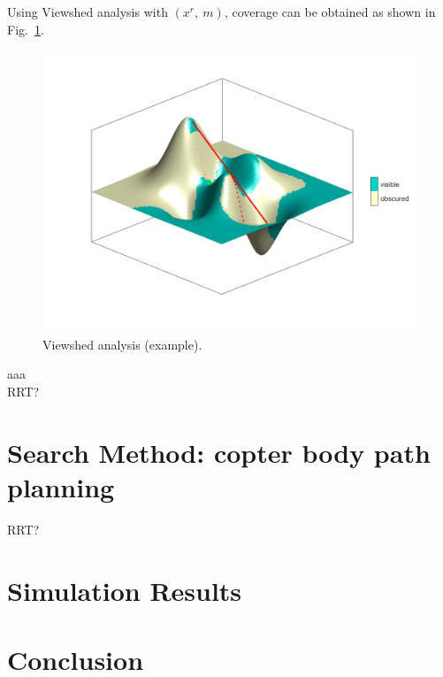 \documentclass[conference]{IEEEtran}
\begin{document}
Using Viewshed analysis with $(x^r,~m)$, coverage can be obtained as shown in Fig.~\ref{fig:vs}.
\begin{figure}[h]
		\centering
		\includegraphics[width=1.0\columnwidth]{figs/vs.png}
		\caption{Viewshed analysis (example).}
		\label{fig:vs}
\end{figure}



aaa\\
RRT?

\section{Search Method: copter body path planning}
RRT?

\section{Simulation Results}

\section{Conclusion}
\end{document}
